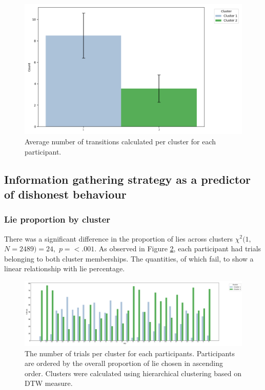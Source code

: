 \documentclass[man, floatsintext]{apa7}
\begin{document}
\begin{figure}[H]
	\centering
	\includegraphics[width=0.75\linewidth]{../plots/ALLTRIAL/NTransitions.png}
	\caption{Average number of transitions calculated per cluster for each participant.}
	\label{fig:NTransitionsPerCluster}
\end{figure}


\subsection{Information gathering strategy as a predictor of dishonest behaviour}

\subsubsection{Lie proportion by cluster}

There was a significant difference in the proportion of lies across clusters $\chi^2(1,$ $N=2489) = 24,$ $p=<.001$. As observed in Figure \ref{fig:NTrialsByPIDPerCluster}, each participant had trials belonging to both cluster memberships. The quantities, of which fail, to show a linear relationship with lie percentage.

\begin{figure}[H]
	\centering
	\includegraphics[width=\linewidth]{../plots/ALLTRIAL/NTrialsByPID.png}
	\caption{The number of trials per cluster for each participants. Participants are ordered by the overall proportion of lie chosen in ascending order. Clusters were calculated using hierarchical clustering based on DTW measure.}
	\label{fig:NTrialsByPIDPerCluster}
\end{figure}
\end{document}
